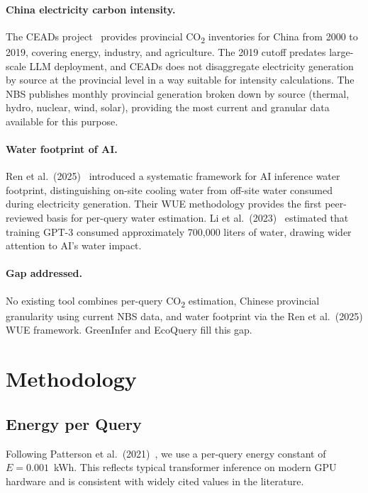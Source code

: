 \documentclass[11pt,a4paper]{article}
\begin{document}
\paragraph{China electricity carbon intensity.}
The CEADs project~\cite{ceads} provides provincial CO\textsubscript{2}
inventories for China from 2000 to 2019, covering energy, industry, and
agriculture. The 2019 cutoff predates large-scale LLM deployment, and
CEADs does not disaggregate electricity generation by source at the
provincial level in a way suitable for intensity calculations. The NBS
publishes monthly provincial generation broken down by source (thermal,
hydro, nuclear, wind, solar), providing the most current and granular data
available for this purpose.

\paragraph{Water footprint of AI.}
Ren et al.\ (2025)~\cite{ren2025} introduced a systematic framework for
AI inference water footprint, distinguishing on-site cooling water from
off-site water consumed during electricity generation. Their WUE
methodology provides the first peer-reviewed basis for per-query water
estimation. Li et al.\ (2023)~\cite{li2023} estimated that training GPT-3
consumed approximately 700,000 liters of water, drawing wider attention to
AI's water impact.

\paragraph{Gap addressed.}
No existing tool combines per-query CO\textsubscript{2} estimation,
Chinese provincial granularity using current NBS data, and water footprint
via the Ren et al.\ (2025) WUE framework. GreenInfer and EcoQuery fill
this gap.

\section{Methodology}

\subsection{Energy per Query}

Following Patterson et al.\ (2021)~\cite{patterson2021}, we use a
per-query energy constant of $E = 0.001$~kWh. This reflects typical
transformer inference on modern GPU hardware and is consistent with widely
cited values in the literature.
\end{document}
